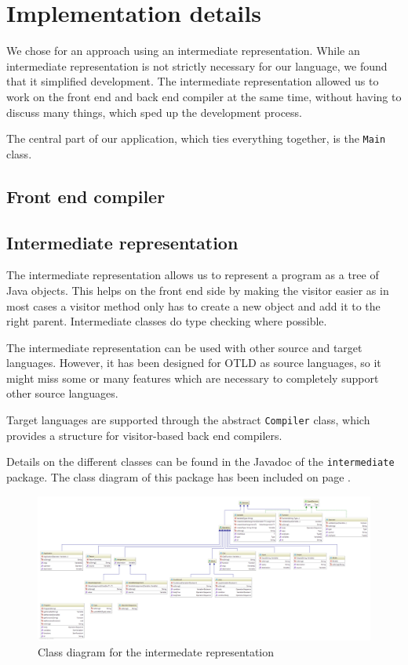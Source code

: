 \chapter{Implementation details}

We chose for an approach using an intermediate representation.
While an intermediate representation is not strictly necessary for our language, we found that it simplified development.
The intermediate representation allowed us to work on the front end and back end compiler at the same time, without having to discuss many things, which sped up the development process.

The central part of our application, which ties everything together, is the \texttt{Main} class.

\section{Front end compiler}


\section{Intermediate representation}

The intermediate representation allows us to represent a program as a tree of Java objects.
This helps on the front end side by making the visitor easier as in most cases a visitor method only has to create a new object and add it to the right parent.
Intermediate classes do type checking where possible.

The intermediate representation can be used with other source and target languages.
However, it has been designed for OTLD as source languages, so it might miss some or many features which are necessary to completely support other source languages.

Target languages are supported through the abstract \texttt{Compiler} class, which provides a structure for visitor-based back end compilers.

Details on the different classes can be found in the Javadoc of the \texttt{intermediate} package. The class diagram of this package has been included on page \pageref{fig:class_diagram__intermediate}.

\begin{figure}[p]
\centering
\includegraphics{Images/class_diagram__intermediate}
\caption{Class diagram for the intermedate representation}
\label{fig:class_diagram__intermediate}
\end{figure}

